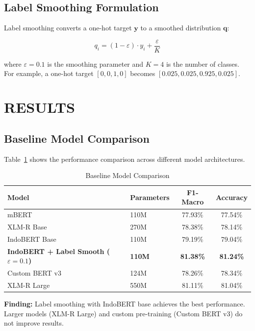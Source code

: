 \documentclass[10pt,journal]{IEEEtran}
\begin{document}
\subsection{Label Smoothing Formulation}

Label smoothing converts a one-hot target $\mathbf{y}$ to a smoothed distribution $\mathbf{q}$:

\begin{equation}
q_i = (1 - \varepsilon) \cdot y_i + \frac{\varepsilon}{K}
\end{equation}

where $\varepsilon = 0.1$ is the smoothing parameter and $K = 4$ is the number of classes. For example, a one-hot target $[0, 0, 1, 0]$ becomes $[0.025, 0.025, 0.925, 0.025]$.

\section{RESULTS}

\subsection{Baseline Model Comparison}

Table~\ref{tab:baseline} shows the performance comparison across different model architectures.

\begin{table}[H]
\centering
\caption{Baseline Model Comparison}
\label{tab:baseline}
\begin{tabular}{@{}llcc@{}}
\toprule
\textbf{Model} & \textbf{Parameters} & \textbf{F1-Macro} & \textbf{Accuracy} \\ \midrule
mBERT & 110M & 77.93\% & 77.54\% \\
XLM-R Base & 270M & 78.38\% & 78.14\% \\
IndoBERT Base & 110M & 79.19\% & 79.04\% \\
\textbf{IndoBERT + Label Smooth ($\varepsilon=0.1$)} & \textbf{110M} & \textbf{81.38\%} & \textbf{81.24\%} \\
Custom BERT v3 & 124M & 78.26\% & 78.34\% \\
XLM-R Large & 550M & 81.11\% & 81.04\% \\ \bottomrule
\end{tabular}
\end{table}

\textbf{Finding:} Label smoothing with IndoBERT base achieves the best performance. Larger models (XLM-R Large) and custom pre-training (Custom BERT v3) do not improve results.
\end{document}
